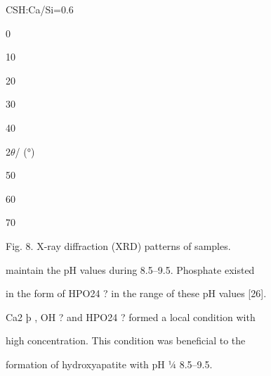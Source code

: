 \documentclass[a4paper,portrait,12pt]{article}
\begin{document}
\begin{flushleft}
CSH:Ca/Si=0.6
\end{flushleft}





0


10





20





30





40


\begin{flushleft}
2$\theta$/ (°)
\end{flushleft}





50





60





70





\begin{flushleft}
Fig. 8. X-ray diffraction (XRD) patterns of samples.
\end{flushleft}





\begin{flushleft}
maintain the pH values during 8.5--9.5. Phosphate existed
\end{flushleft}


\begin{flushleft}
in the form of HPO24 ? in the range of these pH values [26].
\end{flushleft}


\begin{flushleft}
Ca2 þ , OH ? and HPO24 ? formed a local condition with
\end{flushleft}


\begin{flushleft}
high concentration. This condition was beneﬁcial to the
\end{flushleft}


\begin{flushleft}
formation of hydroxyapatite with pH ¼ 8.5--9.5.
\end{flushleft}
\end{document}
